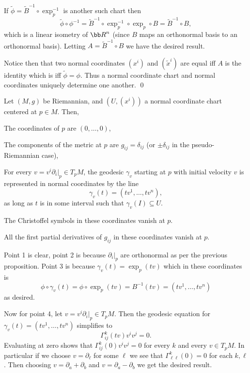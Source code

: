     If $\tilde\phi=\tilde B^{-1}\circ\exp_p^{-1}$ is another such chart then
    $$ \tilde\phi\circ\phi^{-1} = \tilde B^{-1}\circ\exp_p^{-1}\circ\exp_p\circ B = \tilde B^{-1}\circ B , $$
    which is a linear isometry of $\bR^n$ (since $B$ maps an orthonormal basis to an orthonormal basis).
    Letting $A=\tilde B^{-1}\circ B$ we have the desired result.

    Notice then that two normal coordinates $(x^i)$ and $(\tilde x^i)$ are equal iff $A$ is the identity
    which is iff $\tilde\phi=\phi$.
    Thus a normal coordinate chart and normal coordinates uniquely determine one another.
    \qed

\eproof

\bprop

    Let $(M,g)$ be Riemannian, and $(U,(x^i))$ a normal coordinate chart centered at $p\in M$.
    Then,
    \benum
        \item The coordinates of $p$ are $(0,\dots,0)$,
        \item The components of the metric at $p$ are $g_{ij}=\delta_{ij}$ (or $\pm\delta_{ij}$ in the pseudo-Riemannian case),
        \item For every $v=v^i\partial_i|_p\in T_pM$, the geodesic $\gamma_v$ starting at $p$ with initial velocity $v$
        is represented in normal coordinates by the line
        $$ \gamma_v(t) = (tv^1,\dots,tv^n) , $$
        as long as $t$ is in some interval such that $\gamma_v(I)\subseteq U$.
        \item The Christoffel symbols in these coordinates vanish at $p$.
        \item All the first partial derivatives of $g_{ij}$ in these coordinates vanish at $p$.
    \eenum

\eprop

\bproof

    Point 1 is clear, point 2 is because $\partial_i|_p$ are orthonormal as per the previous proposition.
    Point 3 is because $\gamma_v(t)=\exp_p(tv)$ which in these coordinates is
    $$ \phi\circ\gamma_v(t) = \phi\circ\exp_p(tv) = B^{-1}(tv) = (tv^1,\dots,tv^n) $$
    as desired.

    Now for point 4, let $v=v^i\partial_i|_p\in T_pM$.
    Then the geodesic equation for $\gamma_v(t)=(tv^1,\dots,tv^n)$ simplifies to
    $$ \Gamma^k_{ij}(tv)v^iv^j = 0 . $$
    Evaluating at zero shows that $\Gamma^k_{ij}(0)v^iv^j=0$ for every $k$ and every $v\in T_pM$.
    In particular if we choose $v=\partial_\ell$ for some $\ell$ we see that $\Gamma^k_{\ell\ell}(0)=0$ for each $k,\ell$.
    Then choosing $v=\partial_a+\partial_b$ and $v=\partial_a-\partial_b$ we get the desired result.

